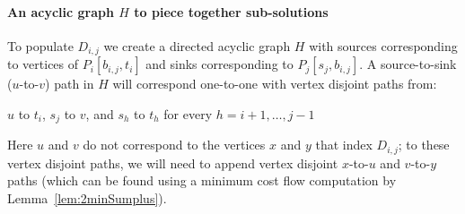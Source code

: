 \documentclass[11pt,twoside]{article}
\newcommand{\spath}[1]{P_{#1}}
\begin{document}
\paragraph{An acyclic graph $H$ to piece together sub-solutions}
To populate $D_{i,j}$ we create a directed acyclic graph $H$ with sources corresponding to vertices of $\spath{i}[b_{i,j},t_i]$ and sinks corresponding to $\spath{j}[s_j, b_{i,j}]$.  A source-to-sink ($u$-to-$v$) path in $H$ will correspond one-to-one with vertex disjoint paths from:
\begin{center}
  $u$ to $t_i$, $s_j$ to $v$, and $s_{h}$ to $t_{h}$ for every $h = i+1,
  \ldots, j-1$
\end{center}
Here $u$ and $v$ do not correspond to the vertices $x$ and $y$ that index $D_{i,j}$; to these vertex disjoint paths, we will need to append vertex disjoint $x$-to-$u$ and $v$-to-$y$ paths (which can be found using a minimum cost flow computation by Lemma~\ref{lem:2minSumplus}).
\end{document}
